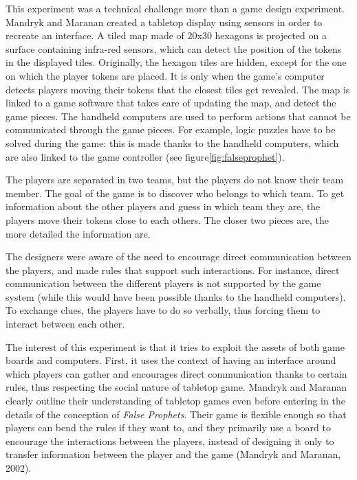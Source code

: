 This experiment was a technical challenge more than a game design experiment. Mandryk and Maranan created a tabletop display using sensors in order to recreate an interface. A tiled map made of 20x30 hexagons is projected on a surface containing infra-red sensors, which can detect the position of the tokens in the displayed tiles. Originally, the hexagon tiles are hidden, except for the one on which the player tokens are placed. It is only when the game's computer detects players moving their tokens that the closest tiles get revealed. The map is linked to a game software that takes care of updating the map, and detect the game pieces. The handheld computers are used to perform actions that cannot be communicated through the game pieces. For example, logic puzzles have to be solved during the game: this is made thanks to the handheld computers, which are also linked to the game controller (see figure\ref{fig:falseprophet}). 

The players are separated in two teams, but the players do not know their team member. The goal of the game is to discover who belongs to which team. To get information about the other players and guess in which team they are, the players move their tokens close to each others. The closer two pieces are, the more detailed the information are. 

The designers were aware of the need to encourage direct communication between the players, and made rules that support such interactions. For instance, direct communication between the different players is not supported by the game system (while this would have been possible thanks to the handheld computers). To exchange clues, the players have to do so verbally, thus forcing them to interact between each other. 

The interest of this experiment is that it tries to exploit the assets of both game boards and computers. First, it uses the context of having an interface around which players can gather and encourages direct communication thanks to certain rules, thus respecting the social nature of tabletop game. Mandryk and Maranan clearly outline their understanding of tabletop games even before entering in the details of the conception of \textit{False Prophets}. Their game is flexible enough so that players can bend the rules if they want to, and they primarily use a board to encourage the interactions between the players, instead of designing it only to transfer information between the player and the game (Mandryk and Maranan, 2002)\cite{art:prophets}.


